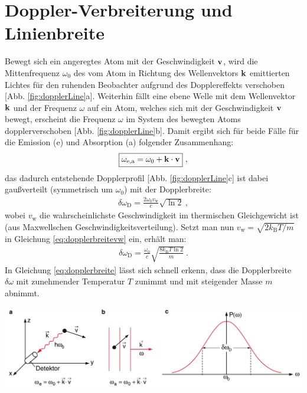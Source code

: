 
\section{Doppler-Verbreiterung und Linienbreite}
\label{sec:dopplerLine}

Bewegt sich ein angeregtes Atom mit der Geschwindigkeit $\boldsymbol{\mathbf{v}}$, wird die Mittenfrequenz $\omega_0$ des vom Atom in Richtung des Wellenvektors $\boldsymbol{\mathbf{k}}$ emittierten Lichtes für den ruhenden Beobachter aufgrund des Dopplereffekts verschoben [Abb. \ref{fig:dopplerLine}a]. Weiterhin fällt eine ebene Welle mit dem Wellenvektor $\boldsymbol{\mathbf{k}}$ und der Frequenz $\omega$ auf ein Atom, welches sich mit der Geschwindigkeit $\boldsymbol{\mathbf{v}}$ bewegt, erscheint die Frequenz $\omega$ im System des bewegten Atoms dopplerverschoben [Abb. \ref{fig:dopplerLine}b]. Damit ergibt sich für beide Fälle für die Emission (e) und Absorption (a) folgender Zusammenhang:
\begin{gather}
    \boxed{\omega_\mathrm{e,a} = \omega_0 + \boldsymbol{\mathbf{k}}\cdot\boldsymbol{\mathbf{v}}}~,
\end{gather}
das dadurch entstehende Dopplerprofil [Abb. \ref{fig:dopplerLine}c] ist dabei gaußverteilt (symmetrisch um $\omega_0$) mit der Dopplerbreite:
\begin{gather}
    \delta \omega_\mathrm{D} = \frac{2\omega_0v_\mathrm{w}}{c} \sqrt{\ln2}~,
    \label{eq:dopplerbreitevw}
\end{gather}
wobei $v_\mathrm{w}$ die wahrscheinlichste Geschwindigkeit im thermischen Gleichgewicht ist (aus Maxwellschen Geschwindigkeitsverteilung). Setzt man nun $v_\mathrm{w} = \sqrt{2k_\mathrm{B}T/m}$ in Gleichung \ref{eq:dopplerbreitevw} ein, erhält man:
\begin{gather}
    \boxed{\delta \omega_\mathrm{D} = \frac{\omega_0}{c}\sqrt{\frac{8k_\mathrm{B}T\ln2}{m}}}~.
    \label{eq:dopplerbreite}
\end{gather}
In Gleichung \ref{eq:dopplerbreite} lässt sich schnell erkenn, dass die Dopplerbreite $\delta \omega$ mit zunehmender Temperatur $T$ zunimmt und mit steigender Masse $m$ abnimmt. \cite{DemtroederAtome}
\begin{center}
    \captionsetup{type=figure}
    \includegraphics[width=\textwidth]{Bilder/Dopplerbreite.png}
    \label{fig:dopplerLine}
\end{center}
